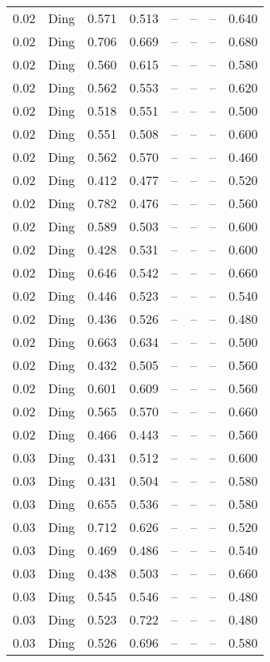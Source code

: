 \begin{table}[H]
\begin{tabular}{l c l l l}
0.02 & Ding & 0.571 & 0.513 & -- & -- & -- & 0.640 \\
0.02 & Ding & 0.706 & 0.669 & -- & -- & -- & 0.680 \\
0.02 & Ding & 0.560 & 0.615 & -- & -- & -- & 0.580 \\
0.02 & Ding & 0.562 & 0.553 & -- & -- & -- & 0.620 \\
0.02 & Ding & 0.518 & 0.551 & -- & -- & -- & 0.500 \\
0.02 & Ding & 0.551 & 0.508 & -- & -- & -- & 0.600 \\
0.02 & Ding & 0.562 & 0.570 & -- & -- & -- & 0.460 \\
0.02 & Ding & 0.412 & 0.477 & -- & -- & -- & 0.520 \\
0.02 & Ding & 0.782 & 0.476 & -- & -- & -- & 0.560 \\
0.02 & Ding & 0.589 & 0.503 & -- & -- & -- & 0.600 \\
0.02 & Ding & 0.428 & 0.531 & -- & -- & -- & 0.600 \\
0.02 & Ding & 0.646 & 0.542 & -- & -- & -- & 0.660 \\
0.02 & Ding & 0.446 & 0.523 & -- & -- & -- & 0.540 \\
0.02 & Ding & 0.436 & 0.526 & -- & -- & -- & 0.480 \\
0.02 & Ding & 0.663 & 0.634 & -- & -- & -- & 0.500 \\
0.02 & Ding & 0.432 & 0.505 & -- & -- & -- & 0.560 \\
0.02 & Ding & 0.601 & 0.609 & -- & -- & -- & 0.560 \\
0.02 & Ding & 0.565 & 0.570 & -- & -- & -- & 0.660 \\
0.02 & Ding & 0.466 & 0.443 & -- & -- & -- & 0.560 \\
0.03 & Ding & 0.431 & 0.512 & -- & -- & -- & 0.600 \\
0.03 & Ding & 0.431 & 0.504 & -- & -- & -- & 0.580 \\
0.03 & Ding & 0.655 & 0.536 & -- & -- & -- & 0.580 \\
0.03 & Ding & 0.712 & 0.626 & -- & -- & -- & 0.520 \\
0.03 & Ding & 0.469 & 0.486 & -- & -- & -- & 0.540 \\
0.03 & Ding & 0.438 & 0.503 & -- & -- & -- & 0.660 \\
0.03 & Ding & 0.545 & 0.546 & -- & -- & -- & 0.480 \\
0.03 & Ding & 0.523 & 0.722 & -- & -- & -- & 0.480 \\
0.03 & Ding & 0.526 & 0.696 & -- & -- & -- & 0.580 \\

\end{tabular}
\end{table}
